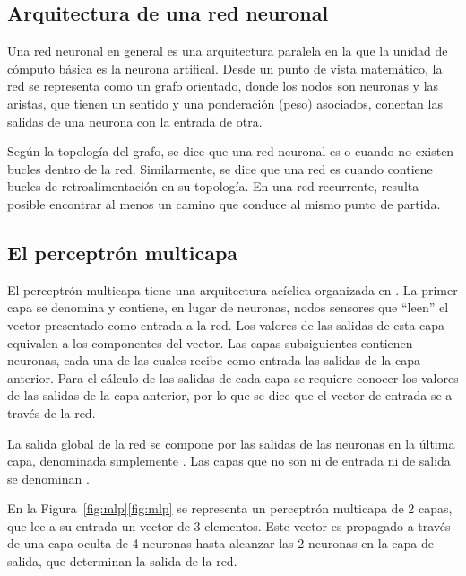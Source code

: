 %
%
\subsection{Arquitectura de una red neuronal}
%
Una red neuronal en general es
una arquitectura paralela en la que la unidad de cómputo
básica es la neurona artifical. Desde un punto de vista matemático,
la red se representa como un grafo orientado, donde los nodos son
neuronas y las aristas, que tienen un sentido y una ponderación (peso)
asociados, conectan las salidas de una neurona con la entrada de otra.

Según la topología del grafo, se dice que una red neuronal es
 o  cuando no existen
bucles dentro de la red. Similarmente, se dice que una red es
 cuando contiene bucles de {retroalimentación} en su
topología. En una red recurrente, resulta posible encontrar al menos
un camino que conduce al mismo punto de partida.
%
%
\subsection{El perceptrón multicapa}
%
El perceptrón multicapa tiene una arquitectura acíclica organizada en
. La primer capa se denomina  y contiene,
en lugar de neuronas, nodos sensores que ``leen'' el vector presentado
como entrada a la red. Los valores de las salidas de esta capa equivalen
a los componentes del vector. Las capas subsiguientes contienen
neuronas, cada una de las cuales recibe como entrada  las
salidas de la capa anterior.  Para el cálculo de las salidas de cada
capa se requiere conocer los valores de las salidas de la capa anterior,
por lo que se dice que el vector de entrada se  a través de la red.


La salida global de la red se compone por las salidas de las neuronas en la
última capa, denominada simplemente . Las capas que no son ni de
entrada ni de salida se denominan .

En la \iflatexml{}Figura~\ref{fig:mlp}\else\autoref{fig:mlp}\fi{} se
representa un perceptrón multicapa de 2 capas, que lee a su entrada un vector de 3
elementos. Este vector es propagado a través de una capa oculta de 4
neuronas hasta alcanzar las 2 neuronas en la capa de
salida, que determinan la salida de la red.
